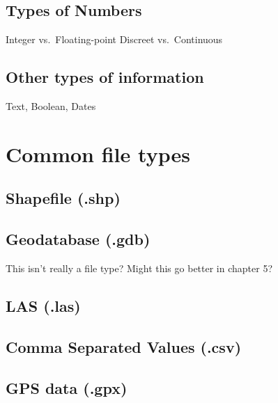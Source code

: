 \documentclass[
]{book}
\begin{document}
\hypertarget{types-of-numbers}{%
\subsection{Types of Numbers}\label{types-of-numbers}}

Integer vs.~Floating-point Discreet vs.~Continuous

\hypertarget{other-types-of-information}{%
\subsection{Other types of information}\label{other-types-of-information}}

Text, Boolean, Dates

\hypertarget{common-file-types}{%
\section{Common file types}\label{common-file-types}}

\hypertarget{shapefile-.shp}{%
\subsection{Shapefile (.shp)}\label{shapefile-.shp}}

\hypertarget{geodatabase-.gdb}{%
\subsection{Geodatabase (.gdb)}\label{geodatabase-.gdb}}

This isn't really a file type? Might this go better in chapter 5?

\hypertarget{las-.las}{%
\subsection{LAS (.las)}\label{las-.las}}

\hypertarget{comma-separated-values-.csv}{%
\subsection{Comma Separated Values (.csv)}\label{comma-separated-values-.csv}}

\hypertarget{gps-data-.gpx}{%
\subsection{GPS data (.gpx)}\label{gps-data-.gpx}}
\end{document}
